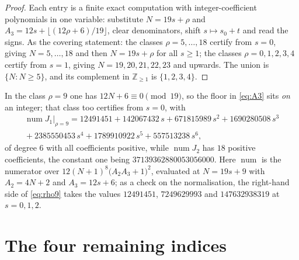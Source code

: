 \documentclass[11pt]{amsart}
\theoremstyle{definition}
\theoremstyle{remark}
\begin{document}
\begin{proof}
Each entry is a finite exact computation with integer-coefficient polynomials in
one variable: substitute $N=19s+\rho$ and $A_3=12s+\lfloor(12\rho+6)/19\rfloor$,
clear denominators, shift $s\mapsto s_0+t$ and read the signs. As the covering
statement: the classes $\rho=5,\dots,18$ certify from $s=0$, giving
$N=5,\dots,18$ and then $N=19s+\rho$ for all $s\ge1$; the classes
$\rho=0,1,2,3,4$ certify from $s=1$, giving $N=19,20,21,22,23$ and upwards.
The union is $\{N: N\ge5\}$, and its complement in $\mathbb Z_{\ge1}$ is
$\{1,2,3,4\}$.
\end{proof}

In the class $\rho=9$ one has $12N+6\equiv0\pmod{19}$, so the floor in
\eqref{eq:A3} sits \emph{on} an integer; that class too certifies from $s=0$,
with
\begin{multline}\label{eq:rho9}
 \operatorname{num}J_1\big|_{\rho=9}
 =12491451+142067432\,s+671815989\,s^2+1690280508\,s^3\\
 {}+2385550453\,s^4+1789910922\,s^5+557513238\,s^6 ,
\end{multline}
of degree $6$ with all coefficients positive, while $\operatorname{num}J_2$ has
$18$ positive coefficients, the constant one being $37139362880053056000$. Here
$\operatorname{num}$ is the numerator over
$12(N+1)^{8}\bigl(A_2A_3+1\bigr)^{2}$, evaluated at $N=19s+9$ with
$A_2=4N+2$ and $A_3=12s+6$; as a check on the normalisation, the right-hand side
of \eqref{eq:rho9} takes the values $12491451$, $7249629993$ and
$147632938319$ at $s=0,1,2$.

\section{The four remaining indices}\label{sec:small}
\end{document}
